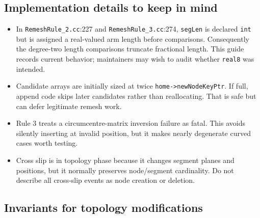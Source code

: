 \documentclass[11pt]{article}
\newcommand{\code}[1]{\texorpdfstring{\nolinkurl{#1}}{#1}}
\newcommand{\srcfile}[1]{\texorpdfstring{\nolinkurl{#1}}{#1}}
\begin{document}
\subsection{Implementation details to keep in mind}

\begin{itemize}
\item In \srcfile{RemeshRule_2.cc}:227 and
\srcfile{RemeshRule_3.cc}:274, \code{segLen} is declared \code{int} but is
assigned a real-valued arm length before comparisons. Consequently the
degree-two length comparisons truncate fractional length. This guide records
current behavior; maintainers may wish to audit whether \code{real8} was
intended.
\item Candidate arrays are initially sized at twice
\code{home->newNodeKeyPtr}. If full, append code skips later candidates rather
than reallocating. That is safe but can defer legitimate remesh work.
\item Rule 3 treats a circumcentre-matrix inversion failure as fatal. This
avoids silently inserting at invalid position, but it makes nearly degenerate
curved cases worth testing.
\item Cross slip is in topology phase because it changes segment planes and
positions, but it normally preserves node/segment cardinality. Do not describe
all cross-slip events as node creation or deletion.
\end{itemize}

\subsection{Invariants for topology modifications}
\end{document}
